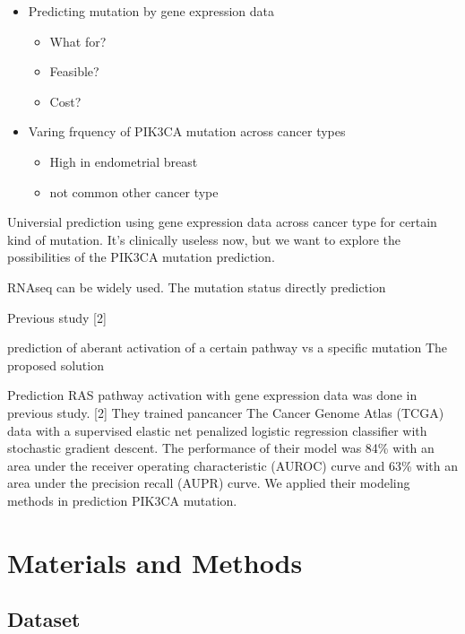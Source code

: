 \documentclass[10pt,letterpaper]{article}
\providecommand{\tightlist}{%
  \setlength{\itemsep}{0pt}\setlength{\parskip}{0pt}}
\begin{document}
\begin{itemize}
\tightlist
\item
  Predicting mutation by gene expression data

  \begin{itemize}
  \tightlist
  \item
    What for?\\
  \item
    Feasible?\\
  \item
    Cost?
  \end{itemize}
\item
  Varing frquency of PIK3CA mutation across cancer types

  \begin{itemize}
  \tightlist
  \item
    High in endometrial breast\\
  \item
    not common other cancer type
  \end{itemize}
\end{itemize}

Universial prediction using gene expression data across cancer type for
certain kind of mutation. It's clinically useless now, but we want to
explore the possibilities of the PIK3CA mutation prediction.

RNAseq can be widely used. The mutation status directly prediction

Previous study {[}2{]}

prediction of aberant activation of a certain pathway vs a specific
mutation The proposed solution

Prediction RAS pathway activation with gene expression data was done in
previous study. {[}2{]} They trained pancancer The Cancer Genome Atlas
(TCGA) data with a supervised elastic net penalized logistic regression
classifier with stochastic gradient descent. The performance of their
model was 84\% with an area under the receiver operating characteristic
(AUROC) curve and 63\% with an area under the precision recall (AUPR)
curve. We applied their modeling methods in prediction PIK3CA mutation.

\hypertarget{materials-and-methods}{%
\section{Materials and Methods}\label{materials-and-methods}}

\hypertarget{dataset}{%
\subsection{Dataset}\label{dataset}}
\end{document}
